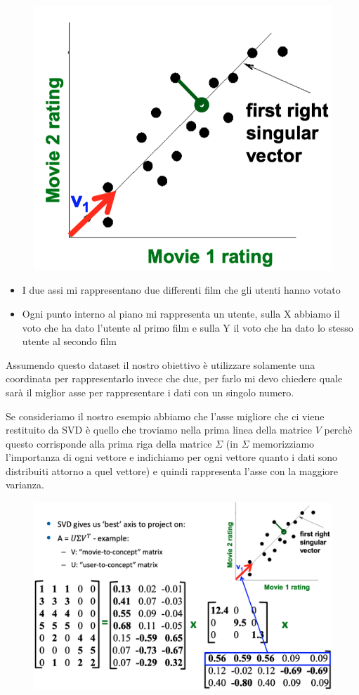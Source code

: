 \documentclass[14pt]{extreport}
\begin{document}
\begin{figure}[H] 
\centering
\includegraphics[width=0.7\linewidth]{503.jpeg}
\end{figure}

\begin{itemize}
	\item I due assi mi rappresentano due differenti film che gli utenti hanno votato
	\item Ogni punto interno al piano mi rappresenta un utente, sulla X abbiamo il voto che ha dato l'utente al primo film e sulla Y il voto che ha dato 
	lo stesso utente al secondo film 
\end{itemize}

Assumendo questo dataset il nostro obiettivo è utilizzare solamente una coordinata per rappresentarlo invece che due, per farlo mi devo chiedere quale sarà 
il miglior asse per rappresentare i dati con un singolo numero.

Se consideriamo il nostro esempio abbiamo che l'asse migliore che ci viene restituito da SVD è quello che troviamo nella prima linea della matrice $V$ perchè questo 
corrisponde alla prima riga della matrice $\Sigma$ (in $\Sigma$ memorizziamo l'importanza di ogni vettore e indichiamo per ogni vettore quanto i dati sono 
distribuiti attorno a quel vettore) e quindi rappresenta l'asse con la maggiore varianza.

\begin{figure}[H] 
\centering
\includegraphics[width=0.7\linewidth]{504.jpeg}
\end{figure}
\end{document}
